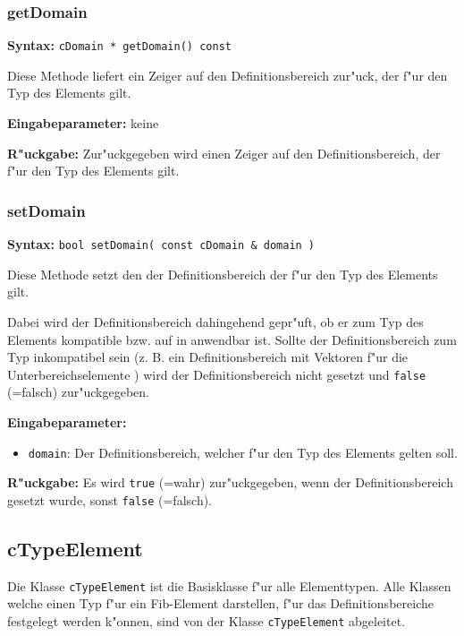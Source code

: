 \subsubsection{getDomain}

\textbf{Syntax:} \verb|cDomain * getDomain() const|

\bigskip\noindent
Diese Methode liefert ein Zeiger auf den Definitionsbereich zur"uck, der f"ur den Typ des Elements gilt.

\bigskip\noindent
\textbf{Eingabeparameter:} keine

\bigskip\noindent
\textbf{R"uckgabe:} Zur"uckgegeben wird einen Zeiger auf den Definitionsbereich, der f"ur den Typ des Elements gilt.


\subsubsection{setDomain}

\textbf{Syntax:} \verb|bool setDomain( const cDomain & domain )|

\bigskip\noindent
Diese Methode setzt den der Definitionsbereich der f"ur den Typ des Elements gilt.

Dabei wird der Definitionsbereich dahingehend gepr"uft, ob er zum Typ des Elements kompatible bzw. auf in anwendbar ist. Sollte der Definitionsbereich zum Typ inkompatibel sein (z. B. ein Definitionsbereich mit Vektoren f"ur die Unterbereichselemente ) wird der Definitionsbereich nicht gesetzt und \verb|false| (=falsch) zur"uckgegeben.

\bigskip\noindent
\textbf{Eingabeparameter:}
\begin{itemize}
 \item \verb|domain|: Der Definitionsbereich, welcher f"ur den Typ des Elements gelten soll.
\end{itemize}

\bigskip\noindent
\textbf{R"uckgabe:} Es wird \verb|true| (=wahr) zur"uckgegeben, wenn der Definitionsbereich gesetzt wurde, sonst \verb|false| (=falsch).


\subsection{cTypeElement}
\label{secCTypeElement}

Die Klasse \verb|cTypeElement| ist die Basisklasse f"ur alle Elementtypen. Alle Klassen welche einen Typ f"ur ein Fib-Element darstellen, f"ur das Definitionsbereiche festgelegt werden k"onnen, sind von der Klasse \verb|cTypeElement| abgeleitet.

